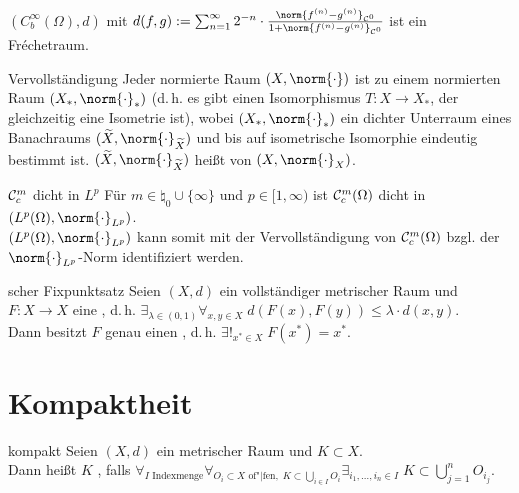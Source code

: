 \linie

\begin{Bsp}
    $(C^\infty_b(\Omega), d)$ mit $d(f, g) := \sum_{n=1}^\infty 2^{-n} \cdot
    \frac{\norm{f^{(n)} - g^{(n)}}_{\C^0}}{1 + \norm{f^{(n)} - g^{(n)}}_{\C^0}}$
    ist ein Fréchetraum.
\end{Bsp}

\begin{Satz}{Vervollständigung}
    Jeder normierte Raum $(X, \norm{\cdot})$ ist  zu einem
    normierten Raum $(X_\ast, \norm{\cdot}_\ast)$
    (d.\,h. es gibt einen Isomorphismus $T\colon X \rightarrow X_\ast$, der gleichzeitig
    eine Isometrie ist),
    wobei $(X_\ast, \norm{\cdot}_\ast)$ ein dichter Unterraum eines Banachraums
    $(\widetilde{X}, \norm{\cdot}_{\widetilde{X}})$ und
    bis auf isometrische Isomorphie eindeutig bestimmt ist.
    $(\widetilde{X}, \norm{\cdot}_{\widetilde{X}})$
    heißt  von $(X, \norm{\cdot}_X)$.
\end{Satz}

\begin{Satz}{$\mathcal{C}^m_c$ dicht in $L^p$}
    Für $m \in \natural_0 \cup \{\infty\}$ und $p \in [1, \infty)$ ist
    $\mathcal{C}^m_c(\Omega)$ dicht in $(L^p(\Omega), \norm{\cdot}_{L^p})$.\\
    $(L^p(\Omega), \norm{\cdot}_{L^p})$ kann somit mit der Vervollständigung von $\mathcal{C}^m_c(\Omega)$
    bzgl. der $\norm{\cdot}_{L^p}$-Norm identifiziert werden.
\end{Satz}

\linie

\begin{Satz}{scher Fixpunktsatz}
    Seien $(X, d)$ ein vollständiger metrischer Raum und\\
    $F\colon X \rightarrow X$ eine , d.\,h.
    $\exists_{\lambda \in (0, 1)} \forall_{x, y \in X}\;
    d(F(x), F(y)) \le \lambda \cdot d(x, y)$.\\
    Dann besitzt $F$ genau einen ,
    d.\,h. $\exists!_{x^\ast \in X}\; F(x^\ast) = x^\ast$.
\end{Satz}

\section{%
    Kompaktheit%
}

\begin{Def}{kompakt}
    Seien $(X, d)$ ein metrischer Raum und $K \subset X$.\\
    Dann heißt $K$ , falls
    $\forall_{I \text{ Indexmenge}} \forall_{O_i \subset X \text{ of"|fen},\;
    K \subset \bigcup_{i \in I} O_i} \exists_{i_1, \dotsc, i_n \in I}\;
    K \subset \bigcup_{j=1}^n O_{i_j}$.
\end{Def}


